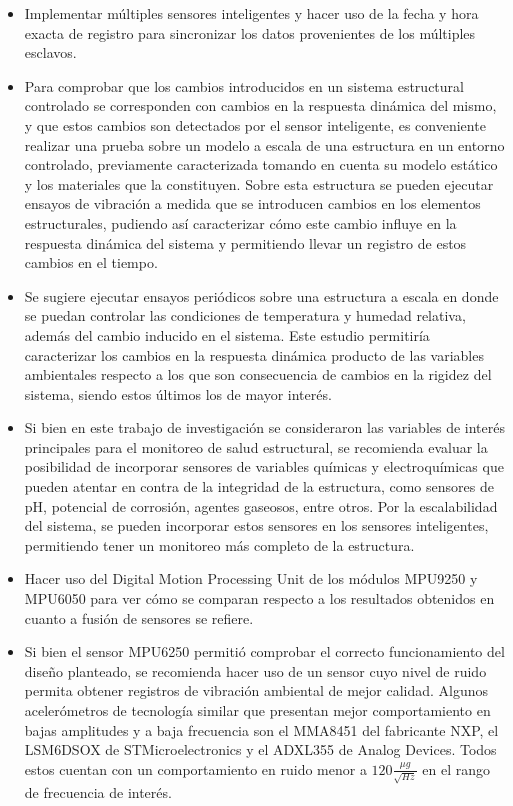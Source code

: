  
\begin{itemize}

    \item Implementar múltiples sensores inteligentes y hacer uso de la fecha y hora exacta de registro para sincronizar los datos provenientes de los múltiples esclavos. 
    
    
    \item Para comprobar que los cambios introducidos en un sistema estructural controlado se corresponden con cambios en la respuesta dinámica del mismo, y que estos cambios son detectados por el sensor inteligente, es conveniente realizar una prueba sobre un modelo a escala de una estructura en un entorno controlado, previamente caracterizada tomando en cuenta su modelo estático y los materiales que la constituyen. Sobre esta estructura se pueden ejecutar ensayos de vibración a medida que se introducen cambios en los elementos estructurales, pudiendo así caracterizar cómo este cambio influye en la respuesta dinámica del sistema y permitiendo llevar un registro de estos cambios en el tiempo.
    
    
    \item Se sugiere ejecutar ensayos periódicos sobre una estructura a escala en donde se puedan controlar las condiciones de temperatura y humedad relativa, además del cambio inducido en el sistema. Este estudio permitiría caracterizar los cambios en la respuesta dinámica producto de las variables ambientales respecto a los que son consecuencia de cambios en la rigidez del sistema, siendo estos últimos los de mayor interés.
    
    
    \item Si bien en este trabajo de investigación se consideraron las variables de interés principales para el monitoreo de salud estructural, se recomienda evaluar la posibilidad de incorporar sensores de variables químicas y electroquímicas que pueden atentar en contra de la integridad de la estructura, como sensores de pH, potencial de corrosión, agentes gaseosos, entre otros. Por la escalabilidad del sistema, se pueden incorporar estos sensores en los sensores inteligentes, permitiendo tener un monitoreo más completo de la estructura.
    
    \item Hacer uso del Digital Motion Processing Unit de los módulos MPU9250 y MPU6050 para ver cómo se comparan respecto a los resultados obtenidos en cuanto a fusión de sensores se refiere.
 
    \item Si bien el sensor MPU6250 permitió comprobar el correcto funcionamiento del diseño planteado, se recomienda hacer uso de un sensor cuyo nivel de ruido permita obtener registros de vibración ambiental de mejor calidad. Algunos acelerómetros de tecnología similar que presentan mejor comportamiento en bajas amplitudes y a baja frecuencia son el MMA8451 del fabricante NXP, el LSM6DSOX de STMicroelectronics y el ADXL355 de Analog Devices. Todos estos cuentan con un comportamiento en ruido menor a $120 \frac{\mu g}{\sqrt{Hz}}$ en el rango de frecuencia de interés.
    

\end{itemize}

